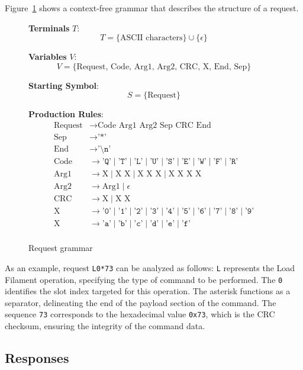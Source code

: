 Figure~\ref{fig:request-grammar} shows a context-free grammar that describes the structure of a request.

\begin{figure}[ht]
\centering
\caption{Request grammar}
\label{fig:request-grammar}

\textbf{Terminals} \( T \): \[ T = \{\text{ASCII characters}\} \cup \{\epsilon\} \]

\textbf{Variables} \( V \): \[ V = \{\text{Request, Code, Arg1, Arg2, CRC, X, End, Sep}\} \]

\textbf{Starting Symbol}: \[ S = \{\text{Request}\} \]

\textbf{Production Rules}:
\begin{align*}
\text{Request} & \to \text{Code Arg1 Arg2 Sep CRC End} \\
\text{Sep} & \to \texttt{'*'} \\
\text{End} & \to \texttt{'\textbackslash n'} \\
\text{Code} & \to \texttt{'Q'} \mid \texttt{'T'} \mid \texttt{'L'} \mid \texttt{'U'} \mid \texttt{'S'} \mid \texttt{'E'} \mid \texttt{'W'} \mid \texttt{'F'} \mid \texttt{'R'} \\
\text{Arg1} & \to \text{X} \mid \text{X X} \mid \text{X X X} \mid \text{X X X X} \\
\text{Arg2} & \to \text{Arg1} \mid \epsilon \\
\text{CRC} & \to \text{X} \mid \text{X X} \\
\text{X} & \to \texttt{'0'} \mid \texttt{'1'} \mid \texttt{'2'} \mid \texttt{'3'} \mid \texttt{'4'} \mid \texttt{'5'} \mid \texttt{'6'} \mid \texttt{'7'} \mid \texttt{'8'} \mid \texttt{'9'} \\
\text{X} & \to \texttt{'a'} \mid \texttt{'b'} \mid \texttt{'c'} \mid \texttt{'d'} \mid \texttt{'e'} \mid \texttt{'f'} \\
\end{align*}
\end{figure}

As an example, request \texttt{L0*73} can be analyzed as follows: \texttt{L} represents the Load Filament operation, specifying the type of command to be performed. The \texttt{0} identifies the slot index targeted for this operation. The asterisk functions as a separator, delineating the end of the payload section of the command. The sequence \texttt{73} corresponds to the hexadecimal value \texttt{0x73}, which is the CRC checksum, ensuring the integrity of the command data.

\subsection{Responses}

